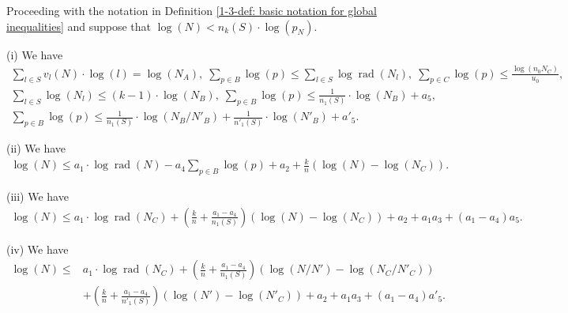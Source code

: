 \documentclass[10pt,a4paper]{amsart}
\DeclareMathOperator{\rad}{\text{rad}}
\begin{document}
\begin{lem} \label{1-3-lem: local-global inequalities}
Proceeding with the notation in Definition \ref{1-3-def: basic notation for global inequalities} and suppose that $\log(N) < n_k(S) \cdot \log(p_N)$.

(i) We have
\small\begin{gather*}
\sum_{l\in S}v_l(N)\cdot\log(l) = \log(N_A),
\; \sum_{p\in B} \log(p) \le  \sum_{l\in S} \log\rad(N_l) ,
\;  \sum_{p\in C} \log(p) \le \frac{\log(n_0 N_C)}{u_0}, 
\\ \sum_{l\in S} \log(N_l)\le (k-1)\cdot\log(N_B),
\; \sum_{p\in B} \log(p) \le \frac{1}{n_1(S)} \cdot \log(N_B) + a_5 ,
\\ \sum_{p\in B} \log(p) \le \frac{1}{n_1(S)} \cdot \log(N_B/N'_B) +  \frac{1}{n'_1(S)} \cdot \log(N'_B) + a'_5 .
\end{gather*}\normalsize

(ii) We have
\small\begin{align}  \label{1-1-eq3}
   \log(N) \le a_1\cdot\log\rad(N) - a_4 \sum_{p\in B}\log(p) + a_2 + \frac{k}{n}(\log(N)-\log(N_C)).
\end{align}\normalsize

(iii) We have
\small\begin{align*}
    \log(N) \le a_1\cdot\log\rad(N_C) + (\frac{k}{n}+ \frac{a_1-a_4}{n_1(S)})(\log(N)-\log(N_C))
    + a_2 + a_1a_3 + (a_1-a_4)a_5 .
\end{align*}\normalsize

(iv) We have 
\small\begin{align*}
\log(N) \le &  a_1 \cdot \log\rad(N_C) 
+ (\frac{k}{n} + \frac{a_1-a_4}{n_1(S)})(\log(N/N')-\log(N_C/N'_C))
\\ & + (\frac{k}{n} + \frac{a_1-a_4}{n'_1(S)})(\log(N')-\log(N'_C))
+ a_2 + a_1a_3 + (a_1-a_4)a'_5 .
\end{align*}\normalsize


\end{lem}
\end{document}
